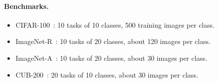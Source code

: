 \paragraph{Benchmarks.}
\begin{itemize}
  \item CIFAR-100~\cite{krizhevsky2009cifar}: 10 tasks of 10 classes, 500
    training images per class.
  \item ImageNet-R~\cite{hendrycks2021many}: 10 tasks of 20 classes, about 120
    images per class.
  \item ImageNet-A~\cite{hendrycks2021nae}: 10 tasks of 20 classes, about 30
    images per class.
  \item CUB-200~\cite{wah2011cub}: 20 tasks of 10 classes, about 30 images per class.
\end{itemize}

